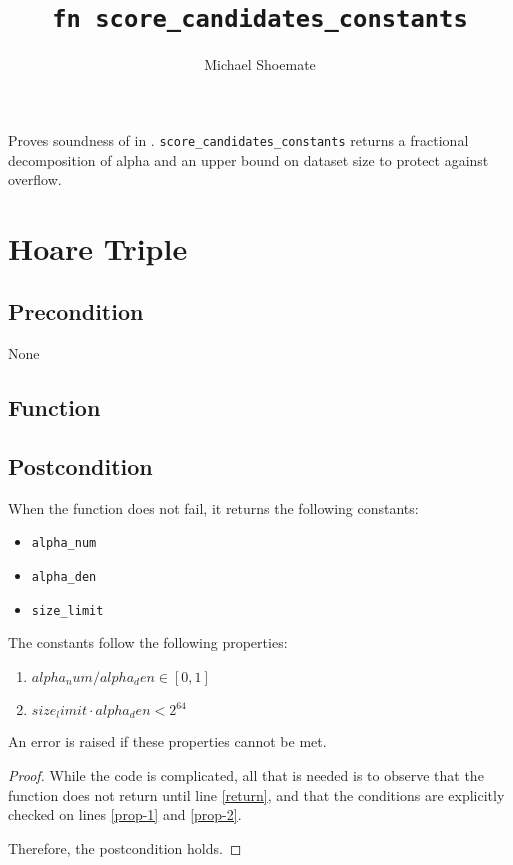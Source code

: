 \documentclass{article}
\title{\texttt{fn score\_candidates\_constants}}
\author{Michael Shoemate}
\begin{document}
\maketitle  


\contrib

Proves soundness of  
in .
\texttt{score\_candidates\_constants} returns a fractional decomposition of alpha and an upper bound on dataset size to protect against overflow.

\section{Hoare Triple}
\subsection*{Precondition}
None

\subsection*{Function}
\label{sec:python-pseudocode}



\subsection*{Postcondition}

\begin{theorem}
    When the function does not fail, it returns the following constants:
    \begin{itemize}
        \item \texttt{alpha\_num}
        \item \texttt{alpha\_den}
        \item \texttt{size\_limit}
    \end{itemize}

    The constants follow the following properties:
    \begin{enumerate}
        \item $alpha_num / alpha_den \in [0, 1]$
        \item $size_limit \cdot alpha_den < 2^{64}$
    \end{enumerate}

    An error is raised if these properties cannot be met.
\end{theorem}

\begin{proof}
    While the code is complicated, all that is needed is to observe that the function does not return until line \ref{return},
    and that the conditions are explicitly checked on lines \ref{prop-1} and \ref{prop-2}.
    
    Therefore, the postcondition holds.
\end{proof}
\end{document}
